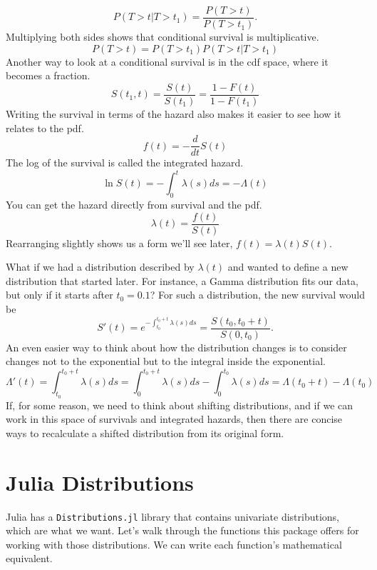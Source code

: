 \documentclass{article}
\begin{document}
\begin{equation}
	P(T>t|T>t_1) = \frac{P(T>t)}{P(T>t_1)}.
\end{equation}
Multiplying both sides shows that conditional survival is multiplicative.
\begin{equation}
	P(T>t)=P(T>t_1)P(T>t|T>t_1)
\end{equation}
Another way to look at a conditional survival is in the cdf space, where it becomes a fraction.
\begin{equation}
	S(t_1,t) = \frac{S(t)}{S(t_1)} = \frac{1-F(t)}{1-F(t_1)}
\end{equation}
Writing the survival in terms of the hazard also makes it easier to see how it relates to the pdf.
\begin{equation}
	f(t)=-\frac{d}{dt}S(t)
\end{equation}
The log of the survival is called the integrated hazard.
\begin{equation}
\ln S(t) = -\int_0^t\lambda(s)ds = -\Lambda(t)
\end{equation}
You can get the hazard directly from survival and the pdf.
\begin{equation}
	\lambda(t) = \frac{f(t)}{S(t)}
\end{equation}
Rearranging slightly shows us a form we'll see later, $f(t)=\lambda(t)S(t)$.

What if we had a distribution described by $\lambda(t)$ and wanted to define a new distribution that started later. For instance, a Gamma distribution fits our data, but only if it starts after $t_0=0.1$? For such a distribution, the new survival would be
\begin{equation}
	S'(t)=e^{-\int_{t_0}^{t_0+t}\lambda(s)ds} = \frac{S(t_0,t_0+t)}{S(0, t_0)}.
\end{equation}
An even easier way to think about how the distribution changes is to consider changes not to the exponential but to the integral inside the exponential.
\begin{equation}
	\Lambda'(t) = \int_{t_0}^{t_0+t}\lambda(s)ds = \int_0^{t_0+t}\lambda(s)ds - \int_0^{t_0}\lambda(s)ds = \Lambda(t_0+t) - \Lambda(t_0)
\end{equation}
If, for some reason, we need to think about shifting distributions, and if we can work in this space of survivals and integrated hazards, then there are concise ways to recalculate a shifted distribution from its original form.


\section{Julia Distributions}\label{sec:juliadist}
Julia has a \texttt{Distributions.jl} library that contains univariate distributions, which are what we want. Let's walk through the functions this package offers for working with those distributions. We can write each function's mathematical equivalent.
\end{document}

